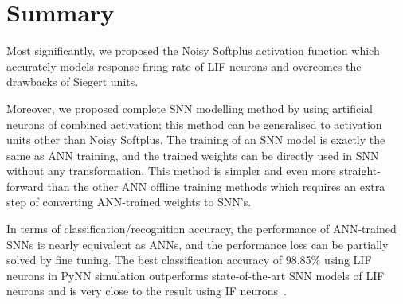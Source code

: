 \documentclass[runningheads,a4paper]{llncs}
\begin{document}
\section{Summary}
Most significantly, we proposed the Noisy Softplus activation function which accurately models response firing rate of LIF neurons and overcomes the drawbacks of Siegert units.
%		
%		
%		
%		

Moreover, we proposed complete SNN modelling method by using artificial neurons of combined activation;
this method can be generalised to activation units other than Noisy Softplus.
The training of an SNN model is exactly the same as ANN training, and the trained weights can be directly used in SNN without any transformation.
This method is simpler and even more straight-forward than the other ANN offline training methods which requires an extra step of converting ANN-trained weights to SNN's.

In terms of classification/recognition accuracy, the performance of ANN-trained SNNs is nearly equivalent as ANNs, and the performance loss can  be partially solved by fine tuning.
The best classification accuracy of 98.85\% using LIF neurons in PyNN simulation outperforms state-of-the-art SNN models of LIF neurons and is very close to the result using IF neurons~\cite{diehl2015fast}.
 
\end{document}
